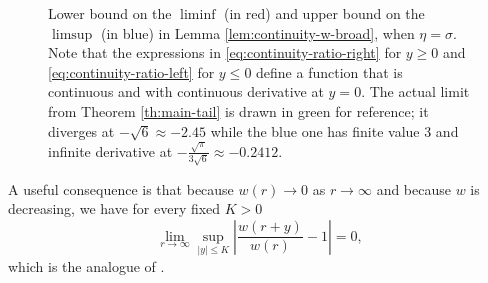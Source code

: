 \documentclass[10pt,a4paper]{article}
\begin{document}
\begin{figure}[h]
\begin{center}
\end{center}
\caption{Lower bound on the $\liminf$ (in red) and upper bound on the $\limsup$ (in blue) in Lemma \ref{lem:continuity-w-broad}, when $\eta = \sigma$. Note that the expressions in \eqref{eq:continuity-ratio-right} for $y\geq 0$ and \eqref{eq:continuity-ratio-left} for $y\leq 0$ define a function that is continuous and with continuous derivative at $y=0$. The actual limit from Theorem \ref{th:main-tail} is drawn in green for reference; it diverges at $-\sqrt{6} \approx -2.45$ while the blue one has finite value $3$ and infinite derivative at $-\frac{\sqrt{\pi}}{3\sqrt{6}} \approx -0.2412$.} %
\end{figure}

A useful consequence is that because $w(r)\to 0$ as $r\to\infty$ and because $w$ is decreasing, we have for every fixed $K>0$ 
\[ \lim_{r\to\infty} \sup_{|y| \leq K} \left| \frac{w(r+y)}{w(r)} -1\right| = 0 , \]
which is the analogue of \cite[Lemma 13]{lalley2015maximal}. 
\end{document}
